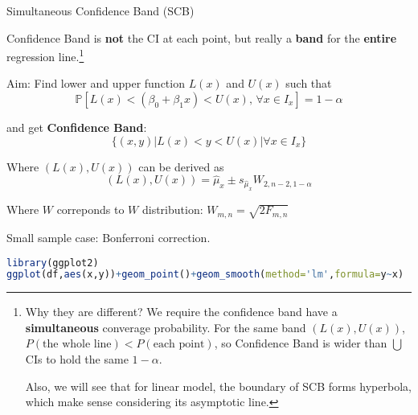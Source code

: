     \begin{point}
       Simultaneous Confidence Band (SCB)
    \end{point}

    Confidence Band is \textbf{not} the CI at each point, but really a \textbf{band} for the \textbf{entire} regression line.\footnote{Why they are different? We require the confidence band have a \textbf{simultaneous} converage probability. For the same band $ (L(x),U(x)) $, $ P(\text{the whole line})< P(\text{each point})$, so Confidence Band is wider than $ \bigcup $CIs to hold the same $ 1-\alpha $.
    
    Also, we will see that for linear model, the boundary of SCB forms hyperbola, which make sense considering its asymptotic line.}
    
    
    Aim: Find lower and upper function $ L(x) $ and $ U(x) $ such that
    \begin{equation}
        \mathbb{P}[L(x)<(\beta _0+\beta _1x)<U(x),\,\forall x\in I_x]=1-\alpha  
    \end{equation}
    
    and get \textbf{Confidence Band}:
    \begin{equation}
        \{(x,y)|L(x)<y<U(x)|\forall x\in I_x\} 
    \end{equation}
    

    Where $ (L(x),U(x)) $ can be derived as
    \begin{equation}
        (L(x),U(x))=\hat{\mu}_x\pm s_{\hat{\mu}_x}W_{2,n-2,1-\alpha}
    \end{equation}

    Where $ W $ correponds to $ W $ distribution: $ W_{m,n}=\sqrt{2F_{m,n}} $
    
    
    
    Small sample case: Bonferroni correction.
    
\begin{rcode}
\begin{lstlisting}[language=R]
library(ggplot2)
ggplot(df,aes(x,y))+geom_point()+geom_smooth(method='lm',formula=y~x)
\end{lstlisting}
\end{rcode}


